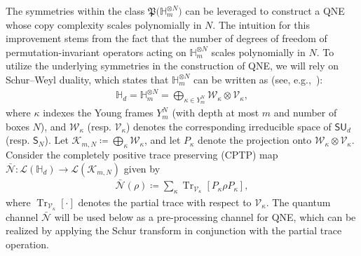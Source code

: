 \documentclass[a4paper,onecolumn,11pt,accepted=2026-05-12]{quantumarticle}
\newcommand{\cK}{\mathcal{K}}
\newcommand{\cL}{\mathcal{L}}
\newcommand{\cN}{\mathcal{N}}
\newcommand{\cV}{\mathcal{V}}
\newcommand{\cW}{\mathcal{W}}
\newcommand{\HH}{\mathbb{H}}
\begin{document}
The symmetries within the class $\mathfrak{P}\big(\HH_m^{\otimes N}\big)$ can be leveraged to construct a QNE whose copy complexity scales polynomially in $N$. The intuition for this improvement stems from the fact that the number of degrees of freedom of permutation-invariant operators acting on $\HH_m^{\otimes N}$ scales polynomially in $N$. To utilize the underlying symmetries in the construction of QNE, we will rely on   Schur--Weyl duality, which states that  $\HH_m^{\otimes N}$ can be written as  (see, e.g.,~\cite[Section 6.2]{Hayashi-2017}):
\begin{align}
    \HH_d=\HH_m^{\otimes N}=\bigoplus_{\kappa \in Y_m^N} \cW_{\kappa} \otimes \cV_{\kappa}, \label{eq:SWduality}
\end{align}
where $\kappa$ indexes the Young frames  $Y_m^N$ (with depth at most $m$ and number of boxes $N$),  and $\cW_{\kappa}$ (resp. $\cV_{\kappa}$)  denotes the corresponding irreducible space of $\mathsf{SU}_d$ (resp.  $\mathsf{S}_N$).  
Let $\cK_{m,N}\coloneqq \bigoplus_{\kappa} \cW_{\kappa}$, and let $P_{\kappa}$ denote the projection onto $\cW_{\kappa} \otimes \cV_{\kappa}$. Consider the completely positive trace preserving (CPTP) map  $\bar{\cN}\colon \cL(\HH_d) \to \cL(\cK_{m,N}) $ given by
\begin{align}
 \bar{\cN}(\rho)\coloneqq \sum_{\kappa} \operatorname{Tr}_{\cV_{\kappa}}[P_{\kappa} \rho P_{\kappa}], \label{eq:schurweylproj}
\end{align}
where $\operatorname{Tr}_{\cV_{\kappa}}[\cdot]$ denotes the partial trace with respect to $\cV_{\kappa}$. The quantum channel $ \bar{\cN}$  will be used below as a pre-processing channel for QNE, which can be realized by applying the Schur transform in conjunction with the partial trace operation.  
\end{document}
